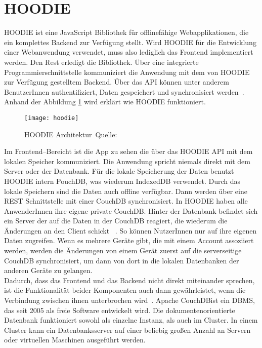 \section{HOODIE}
HOODIE ist eine JavaScript Bibliothek für offlinefähige Webapplikationen, die ein komplettes Backend zur Verfügung stellt.
Wird HOODIE für die Entwicklung einer Webanwendung verwendet, muss also lediglich das Frontend implementiert werden.
Den Rest erledigt die Bibliothek. Über eine integrierte Programmierschnittstelle kommuniziert die Anwendung mit dem von HOODIE zur Verfügung gestelltem Backend.
Über das \gls{API} können unter anderem BenutzerInnen authentifiziert, Daten gespeichert und synchronisiert werden~\cite{hoodie}.\\
Anhand der Abbildung \ref{fig:hoodie} wird erklärt wie HOODIE funktioniert.
%
\begin{figure}[H]
  \centering
  \texttt{[image: hoodie]}
  \grayRule
  \caption[HOODIE Architektur]{HOODIE Architektur~Quelle:~\cite{hoodie-how}}
  \label{fig:hoodie}
\end{figure}
%
Im Frontend--Bereicht ist die App zu sehen die über das HOODIE \gls{API} mit dem lokalen Speicher kommuniziert.
Die Anwendung spricht niemals direkt mit dem Server oder der Datenbank. Für die lokale Speicherung der Daten benutzt HOODIE intern PouchDB, was wiederum IndexedDB verwendet. Durch das lokale Speichern sind die Daten auch offline verfügbar. Dann werden über eine \gls{REST} Schnittstelle mit einer CouchDB synchronisiert.
In HOODIE haben alle AnwenderInnen ihre eigene private CouchDB.
Hinter der Datenbank befindet sich ein Server der auf die Daten in der CouchDB reagiert, die wiederum die Änderungen an den Client schickt ~\cite{hoodie-how}.
So können NutzerInnen nur auf ihre eigenen Daten zugreifen. Wenn es mehrere Geräte gibt, die mit einem Account assoziiert werden, werden die Änderungen von einem Gerät zuerst auf die serverseitige CouchDB synchronisiert, um dann von dort in die lokalen Datenbanken der anderen Geräte zu gelangen.\\
Dadurch, dass das Frontend und das Backend nicht direkt miteinander sprechen, ist die Funktionalität beider Komponenten auch dann gewährleistet, wenn die Verbindung zwischen ihnen unterbrochen wird~\cite{hoodie-how}.
% 
% 
Apache CouchDB\tm ist ein \gls{DBMS}, das seit 2005 als freie Software entwickelt wird. Die dokumentenorientierte Datenbank funktioniert sowohl als einzelne Instanz, als auch im Cluster. In einem Cluster kann ein Datenbanksserver auf einer beliebig großen Anzahl an Servern oder virtuellen Maschinen ausgeführt werden.\\
